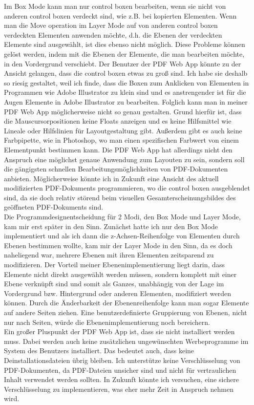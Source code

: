Im Box Mode kann man nur control boxen bearbeiten, wenn sie nicht von anderen control boxen verdeckt sind, wie z.B. bei kopierten Elementen. Wenn man die Move operation im Layer Mode auf von anderen control boxen verdeckten Elementen anwenden möchte, d.h. die Ebenen der verdeckten Elemente sind ausgewählt, ist dies ebenso nicht möglich. Diese Probleme können gelöst werden, indem mit die Ebenen der Elemente, die man bearbeiten möchte, in den Vordergrund verschiebt. Der Benutzer der PDF Web App könnte zu der Ansicht gelangen, dass die control boxen etwas zu groß sind. Ich habe sie deshalb so riesig gestaltet, weil ich finde, dass die Boxen zum Anklicken von Elementen in Programmen wie Adobe Illustrator zu klein sind und es anstrengender ist für die Augen Elemente in Adobe Illustrator zu bearbeiten. Folglich kann man in meiner PDF Web App möglicherweise nicht so genau gestalten. Grund hierfür ist, dass die Mauscursorpositionen keine Floats anzeigen und es keine Hilfsmittel wie Lineale oder Hilfslinien für Layoutgestaltung gibt. Außerdem gibt es auch keine Farbpipette, wie in Photoshop, wo man einen spezifischen Farbwert von einem Elementpunkt bestimmen kann. Die PDF Web App hat allerdings nicht den Anspruch eine möglichst genaue Anwendung zum Layouten zu sein, sondern soll die gängigsten schnellen Bearbeitungsmöglichkeiten von PDF-Dokumenten anbieten. Möglicherweise könnte ich in Zukunft eine Ansicht des aktuell modifizierten PDF-Dokuments programmieren, wo die control boxen ausgeblendet sind, da sie doch relativ störend beim visuellen Gesamterscheinungsbildes des geöffneten PDF-Dokuments sind. \\
Die Programmdesignentscheidung für 2 Modi, den Box Mode und Layer Mode, kam mir erst später in den Sinn. Zunächst hatte ich nur den Box Mode implementiert und als ich dann die z-Achsen-Reihenfolge von Elementen durch Ebenen bestimmen wollte, kam mir der Layer Mode in den Sinn, da es doch naheliegend war, mehrere Ebenen mit ihren Elementen zeitsparend zu modifizieren. Der Vorteil meiner Ebenenimplementierung liegt darin, dass Elemente nicht direkt ausgewählt werden müssen, sondern komplett mit einer Ebene verknüpft sind und somit als Ganzes, unabhängig von der Lage im Vordergrund bzw. Hintergrund oder anderen Elementen, modifiziert werden können. Durch die Änderbarkeit der Ebenenreihenfolge kann man sogar Elemente auf andere Seiten ziehen. Eine benutzerdefinierte Gruppierung von Ebenen, nicht nur nach Seiten, würde die Ebenenimplementierung noch bereichern. \\   
Ein großer Pluspunkt der PDF Web App ist, dass sie nicht installiert werden muss. Dabei werden auch keine zusätzlichen ungewünschten Werbeprogramme im System des Benutzers installiert. Das bedeutet auch, dass keine Deinstallationsdateien übrig bleiben. Ich unterstütze keine Verschlüsselung von PDF-Dokumenten, da PDF-Dateien unsicher sind und nicht für vertraulichen Inhalt verwendet werden sollten. In Zukunft könnte ich versuchen, eine sichere Verschlüsselung zu implementieren, was eher mehr Zeit in Anspruch nehmen wird. \\

